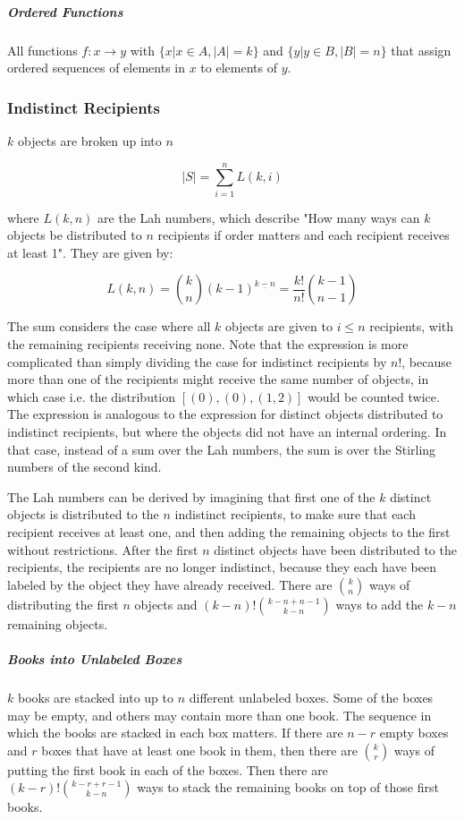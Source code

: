 \subparagraph{Ordered Functions}  All functions $f: x \rightarrow y$ with $\{x | x\in A, |A| = k \}$ and $\{y | y\in B, |B| = n\}$ that assign ordered sequences of elements in $x$ to elements of $y$.

\subsubsection{Indistinct Recipients}
$k$ objects are broken up into $n$ 

\begin{equation}
|S| = \sum_{i=1}^n L(k,i) 
\end{equation}

where $L(k,n)$ are the Lah numbers, which describe "How many ways can $k$ objects be distributed to $n$ recipients if order matters and each recipient receives at least 1". They are given by:

\begin{equation}
L(k,n)= {k \choose n} (k-1)^{\underline{k-n}} = \frac{k!}{n!}{ k-1 \choose n-1 }
\end{equation}

The sum considers the case where all $k$ objects are given to $i\leq n$ recipients, with the remaining recipients receiving none. Note that the expression is more complicated than simply dividing the case for indistinct recipients by $n!$, because more than one of the recipients might receive the same number of objects, in which case i.e. the distribution $[(0),(0),(1,2)]$ would be counted twice. The expression is analogous to the expression for distinct objects distributed to indistinct recipients, but where the objects did not have an internal ordering. In that case, instead of a sum over the Lah numbers, the sum is over the Stirling numbers of the second kind. 

The Lah numbers can be derived by imagining that first one of the $k$ distinct objects is distributed to the $n$ indistinct recipients, to make sure that each recipient receives at least one, and then adding the remaining objects to the first without restrictions. After the first $n$ distinct objects have been distributed to the recipients, the recipients are no longer indistinct, because they each have been labeled by the object they have already received. There are ${k \choose n}$ ways of distributing the first $n$ objects and $(k-n)!{k-n+n-1 \choose k-n}$ ways to add the $k-n$ remaining objects.

\subparagraph{Books into Unlabeled Boxes} $k$ books are stacked into up to $n$ different unlabeled boxes. Some of the boxes may be empty, and others may contain more than one book. The sequence in which the books are stacked in each box matters. If there are $n-r$ empty boxes and $r$ boxes that have at least one book in them, then there are ${k \choose r}$ ways of putting the first book in each of the boxes. Then there are $(k-r)!{k-r+r-1 \choose k-n}$ ways to stack the remaining books on top of those first books. 

